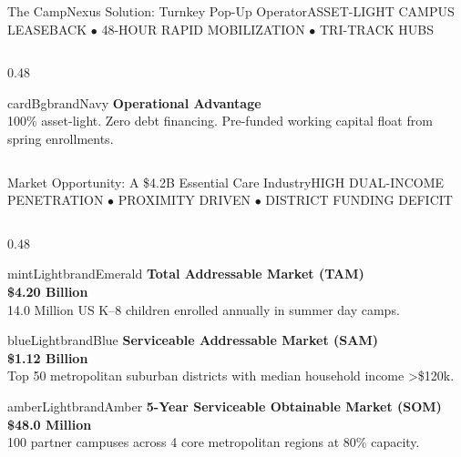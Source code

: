 \documentclass[aspectratio=169,9pt]{beamer}
\begin{document}
\begin{frame}{The CampNexus Solution: Turnkey Pop-Up Operator}{ASSET-LIGHT CAMPUS LEASEBACK $\bullet$ 48-HOUR RAPID MOBILIZATION $\bullet$ TRI-TRACK HUBS}
\begin{columns}[T]
\begin{column}{0.48\textwidth}
    \vskip2pt
    \begin{execbox}{cardBg}{brandNavy}
      \textcolor{brandNavy}{\textbf{\scriptsize Operational Advantage}} \\[1pt]
      \tiny
      100\% asset-light. Zero debt financing. Pre-funded working capital float from spring enrollments.
    \end{execbox}
  \end{column}
\end{columns}

\end{frame}

\begin{frame}{Market Opportunity: A \$4.2B Essential Care Industry}{HIGH DUAL-INCOME PENETRATION $\bullet$ PROXIMITY DRIVEN $\bullet$ DISTRICT FUNDING DEFICIT}

\begin{columns}[T]
  \begin{column}{0.48\textwidth}
    \begin{execbox}{mintLight}{brandEmerald}
      \textcolor{brandEmerald}{\textbf{\tiny Total Addressable Market (TAM)}} \\[1pt]
      \textcolor{brandNavy}{\textbf{\normalsize \$4.20 Billion}} \\[1pt]
      \tiny 14.0 Million US K--8 children enrolled annually in summer day camps.
    \end{execbox}

    \vskip2pt
    \begin{execbox}{blueLight}{brandBlue}
      \textcolor{brandBlue}{\textbf{\tiny Serviceable Addressable Market (SAM)}} \\[1pt]
      \textcolor{brandNavy}{\textbf{\normalsize \$1.12 Billion}} \\[1pt]
      \tiny Top 50 metropolitan suburban districts with median household income >\$120k.
    \end{execbox}

    \vskip2pt
    \begin{execbox}{amberLight}{brandAmber}
      \textcolor{brandAmber}{\textbf{\tiny 5-Year Serviceable Obtainable Market (SOM)}} \\[1pt]
      \textcolor{brandNavy}{\textbf{\normalsize \$48.0 Million}} \\[1pt]
      \tiny 100 partner campuses across 4 core metropolitan regions at 80\% capacity.
    \end{execbox}
  \end{column}


\end{columns}
\end{frame}
\end{document}
